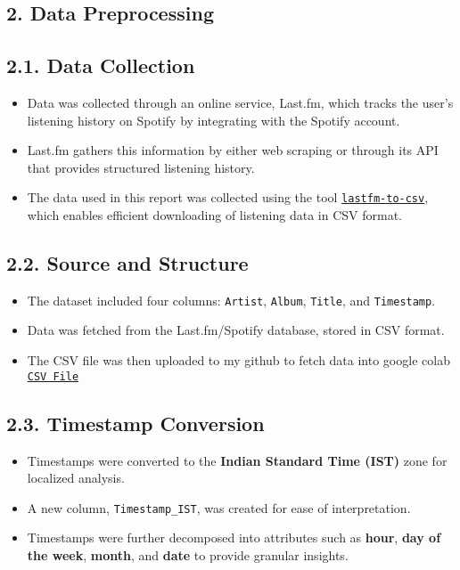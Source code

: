\documentclass[12pt]{article}
\begin{document}
\begin{itemize}
\section*{2. Data Preprocessing}
\subsection*{2.1. Data Collection}
\begin{itemize}
\item Data was collected through an online service, Last.fm, which tracks the user's listening history on Spotify by integrating with the Spotify account.
\item Last.fm gathers this information by either web scraping or through its API that provides structured listening history.
\item The data used in this report was collected using the tool \href{https://github.com/benfoxall/lastfm-to-csv}{\texttt{lastfm-to-csv}}, which enables efficient downloading of listening data in CSV format.
\end{itemize}

\subsection*{2.2. Source and Structure}
\begin{itemize}
\item The dataset included four columns: \texttt{Artist}, \texttt{Album}, \texttt{Title}, and \texttt{Timestamp}.
\item Data was fetched from the Last.fm/Spotify database, stored in CSV format.
\item The CSV file was then uploaded to my github to fetch data into google colab \href{https://raw.githubusercontent.com/amaydixit11/Academics/refs/heads/main/DSL251/HomeWork1/Data%20Analysis/spotify_last_fm_data_apr_to_dec_2024.csv}{\texttt{CSV File}}
\end{itemize}

\subsection*{2.3. Timestamp Conversion}
\begin{itemize}
    \item Timestamps were converted to the \textbf{Indian Standard Time (IST)} zone for localized analysis.
    \item A new column, \texttt{Timestamp\_IST}, was created for ease of interpretation.
    \item Timestamps were further decomposed into attributes such as \textbf{hour}, \textbf{day of the week}, \textbf{month}, and \textbf{date} to provide granular insights.
\end{itemize}


\end{itemize}
\end{document}
